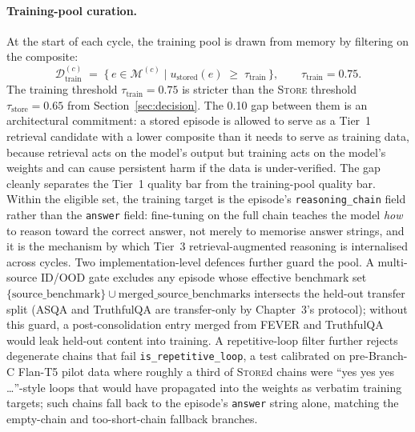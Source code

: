 \paragraph{Training-pool curation.}
At the start of each cycle, the training pool is drawn from memory by filtering on the composite:
\begin{equation}
\mathcal{D}_{\text{train}}^{(c)} \;=\; \{\,e \in \mathcal{M}^{(c)} \;|\; u_{\text{stored}}(e) \;\geq\; \tau_{\text{train}}\,\}, \qquad \tau_{\text{train}} = 0.75.
\label{eq:train-pool}
\end{equation}
The training threshold $\tau_{\text{train}} = 0.75$ is stricter than the \textsc{Store} threshold $\tau_{\text{store}} = 0.65$ from Section~\ref{sec:decision}. The 0.10 gap between them is an architectural commitment: a stored episode is allowed to serve as a Tier~1 retrieval candidate with a lower composite than it needs to serve as training data, because retrieval acts on the model's output but training acts on the model's weights and can cause persistent harm if the data is under-verified. The gap cleanly separates the Tier~1 quality bar from the training-pool quality bar. Within the eligible set, the training target is the episode's \texttt{reasoning\_chain} field rather than the \texttt{answer} field: fine-tuning on the full chain teaches the model \emph{how} to reason toward the correct answer, not merely to memorise answer strings, and it is the mechanism by which Tier~3 retrieval-augmented reasoning is internalised across cycles. Two implementation-level defences further guard the pool. A multi-source ID/OOD gate excludes any episode whose effective benchmark set $\{\text{source\_benchmark}\} \cup \text{merged\_source\_benchmarks}$ intersects the held-out transfer split (ASQA and TruthfulQA are transfer-only by Chapter~3's protocol); without this guard, a post-consolidation entry merged from FEVER and TruthfulQA would leak held-out content into training. A repetitive-loop filter further rejects degenerate chains that fail \texttt{is\_repetitive\_loop}, a test calibrated on pre-Branch-C Flan-T5 pilot data where roughly a third of \textsc{Store}d chains were ``yes yes yes \ldots''-style loops that would have propagated into the weights as verbatim training targets; such chains fall back to the episode's \texttt{answer} string alone, matching the empty-chain and too-short-chain fallback branches.

